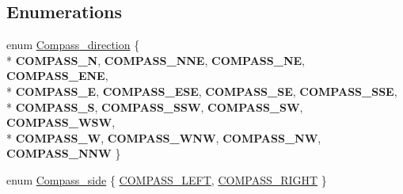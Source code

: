 \subsection*{Enumerations}
\begin{DoxyCompactItemize}
\item 
enum \hyperlink{bicorder-compass_8h_a642eb4472a57f1a847ee101e3b7af5ba}{Compass\+\_\+direction} \{ \\*
{\bfseries C\+O\+M\+P\+A\+S\+S\+\_\+N}, 
{\bfseries C\+O\+M\+P\+A\+S\+S\+\_\+\+N\+NE}, 
{\bfseries C\+O\+M\+P\+A\+S\+S\+\_\+\+NE}, 
{\bfseries C\+O\+M\+P\+A\+S\+S\+\_\+\+E\+NE}, 
\\*
{\bfseries C\+O\+M\+P\+A\+S\+S\+\_\+E}, 
{\bfseries C\+O\+M\+P\+A\+S\+S\+\_\+\+E\+SE}, 
{\bfseries C\+O\+M\+P\+A\+S\+S\+\_\+\+SE}, 
{\bfseries C\+O\+M\+P\+A\+S\+S\+\_\+\+S\+SE}, 
\\*
{\bfseries C\+O\+M\+P\+A\+S\+S\+\_\+S}, 
{\bfseries C\+O\+M\+P\+A\+S\+S\+\_\+\+S\+SW}, 
{\bfseries C\+O\+M\+P\+A\+S\+S\+\_\+\+SW}, 
{\bfseries C\+O\+M\+P\+A\+S\+S\+\_\+\+W\+SW}, 
\\*
{\bfseries C\+O\+M\+P\+A\+S\+S\+\_\+W}, 
{\bfseries C\+O\+M\+P\+A\+S\+S\+\_\+\+W\+NW}, 
{\bfseries C\+O\+M\+P\+A\+S\+S\+\_\+\+NW}, 
{\bfseries C\+O\+M\+P\+A\+S\+S\+\_\+\+N\+NW}
 \}
\item 
enum \hyperlink{bicorder-compass_8h_a7e36843c53aaafda9795876e659ffe7b}{Compass\+\_\+side} \{ \hyperlink{bicorder-compass_8h_a7e36843c53aaafda9795876e659ffe7ba15cd36c342feb4b23e9a69bda67bcca8}{C\+O\+M\+P\+A\+S\+S\+\_\+\+L\+E\+FT}, 
\hyperlink{bicorder-compass_8h_a7e36843c53aaafda9795876e659ffe7ba61001c6c8cf0fa674b3039da44c1b005}{C\+O\+M\+P\+A\+S\+S\+\_\+\+R\+I\+G\+HT}
 \}
\end{DoxyCompactItemize}
